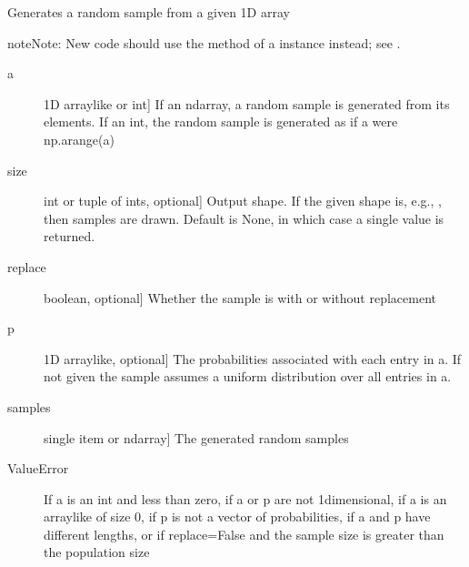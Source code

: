 \documentclass[letterpaper,10pt,english]{sphinxmanual}
\begin{document}
\begin{fulllineitems}
\label{\detokenize{infrapy.utils:infrapy.utils.ref2sac.choice}}
Generates a random sample from a given 1\sphinxhyphen{}D array
\begin{quote}

\end{quote}

\begin{sphinxadmonition}{note}{Note:}
New code should use the  method of a 
instance instead; see .
\end{sphinxadmonition}
\begin{description}
\item[{a}] \leavevmode{[}1\sphinxhyphen{}D array\sphinxhyphen{}like or int{]}
If an ndarray, a random sample is generated from its elements.
If an int, the random sample is generated as if a were np.arange(a)

\item[{size}] \leavevmode{[}int or tuple of ints, optional{]}
Output shape.  If the given shape is, e.g., , then
 samples are drawn.  Default is None, in which case a
single value is returned.

\item[{replace}] \leavevmode{[}boolean, optional{]}
Whether the sample is with or without replacement

\item[{p}] \leavevmode{[}1\sphinxhyphen{}D array\sphinxhyphen{}like, optional{]}
The probabilities associated with each entry in a.
If not given the sample assumes a uniform distribution over all
entries in a.

\end{description}
\begin{description}
\item[{samples}] \leavevmode{[}single item or ndarray{]}
The generated random samples

\end{description}
\begin{description}
\item[{ValueError}] \leavevmode
If a is an int and less than zero, if a or p are not 1\sphinxhyphen{}dimensional,
if a is an array\sphinxhyphen{}like of size 0, if p is not a vector of
probabilities, if a and p have different lengths, or if
replace=False and the sample size is greater than the population
size


\end{description}
\end{fulllineitems}
\end{document}
